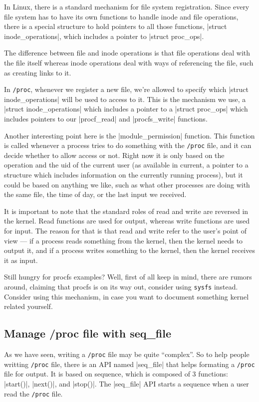 \documentclass[10pt, oneside]{book}
\begin{document}
In Linux, there is a standard mechanism for file system registration.
Since every file system has to have its own functions to handle inode and file operations, there is a special structure to hold pointers to all those functions, \cpp|struct inode_operations|, which includes a pointer to \cpp|struct proc_ops|.

The difference between file and inode operations is that file operations deal with the file itself whereas inode operations deal with ways of referencing the file, such as creating links to it.

In \verb|/proc|, whenever we register a new file, we're allowed to specify which \cpp|struct inode_operations| will be used to access to it.
This is the mechanism we use, a \cpp|struct inode_operations| which includes a pointer to a \cpp|struct proc_ops| which includes pointers to our \cpp|procf_read| and \cpp|procfs_write| functions.

Another interesting point here is the \cpp|module_permission| function.
This function is called whenever a process tries to do something with the \verb|/proc| file, and it can decide whether to allow access or not.
Right now it is only based on the operation and the uid of the current user (as available in current, a pointer to a structure which includes information on the currently running process), but it could be based on anything we like, such as what other processes are doing with the same file, the time of day, or the last input we received.

It is important to note that the standard roles of read and write are reversed in the kernel.
Read functions are used for output, whereas write functions are used for input.
The reason for that is that read and write refer to the user's point of view --- if a process reads something from the kernel, then the kernel needs to output it, and if a process writes something to the kernel, then the kernel receives it as input.


Still hungry for procfs examples?
Well, first of all keep in mind, there are rumors around, claiming that procfs is on its way out, consider using \verb|sysfs| instead.
Consider using this mechanism, in case you want to document something kernel related yourself.

\subsection{Manage /proc file with seq\_file}
\label{sec:manage_procfs_with_seq_file}
As we have seen, writing a \verb|/proc| file may be quite ``complex''.
So to help people writting \verb|/proc| file, there is an API named \cpp|seq_file| that helps formating a \verb|/proc| file for output.
It is based on sequence, which is composed of 3 functions: \cpp|start()|, \cpp|next()|, and \cpp|stop()|.
The \cpp|seq_file| API starts a sequence when a user read the \verb|/proc| file.
\end{document}
